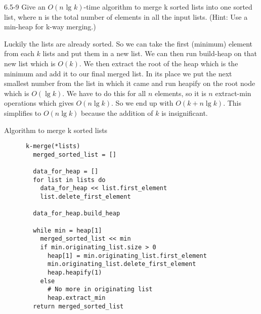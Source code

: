 \begin{problem}{6.5-9}
  Give an $O(n \text{ lg }k)$-time algorithm to merge k sorted lists into one sorted list, where n is the total number of elements in
  all the input lists. (Hint: Use a min-heap for k-way merging.)

  \begin{solution}
    Luckily the lists are already sorted. So we can take the first (minimum) element from each $k$
    lists and put them in     a new list. We can then run build-heap on that new list which is $O(k)$. We then extract the
    root of the heap which is the     minimum and add it to our final merged list. In its place we put the next smallest
    number from the list     in which it came and run heapify on the root node which is $O(\lg k)$. We have to do this for
    all $n$ elements, so it     is $n$ extract-min operations which gives $O(n \lg k)$. So we end up with $O(k + n \lg k)$.
    This simplifies to $O(n \lg k)$ because the addition of $k$ is insignificant. \\

    \centerline{Algorithm to merge k sorted lists}
    \begin{lstlisting}
      k-merge(*lists)
        merged_sorted_list = []

        data_for_heap = []
        for list in lists do
          data_for_heap << list.first_element
          list.delete_first_element

        data_for_heap.build_heap

        while min = heap[1]
          merged_sorted_list << min
          if min.originating_list.size > 0
            heap[1] = min.originating_list.first_element
            min.originating_list.delete_first_element
            heap.heapify(1)
          else
            # No more in originating list
            heap.extract_min
        return merged_sorted_list
    \end{lstlisting}
  \end{solution}
\end{problem}


